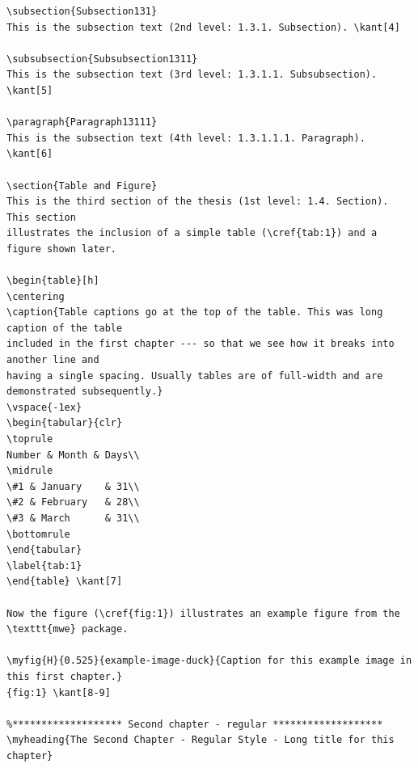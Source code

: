 \documentclass{article}
\begin{document}
\begin{verbatim}
\subsection{Subsection131}
This is the subsection text (2nd level: 1.3.1. Subsection). \kant[4]

\subsubsection{Subsubsection1311}
This is the subsection text (3rd level: 1.3.1.1. Subsubsection). \kant[5]

\paragraph{Paragraph13111}
This is the subsection text (4th level: 1.3.1.1.1. Paragraph). \kant[6]

\section{Table and Figure}
This is the third section of the thesis (1st level: 1.4. Section). This section
illustrates the inclusion of a simple table (\cref{tab:1}) and a figure shown later.

\begin{table}[h]
\centering
\caption{Table captions go at the top of the table. This was long caption of the table
included in the first chapter --- so that we see how it breaks into another line and
having a single spacing. Usually tables are of full-width and are demonstrated subsequently.}
\vspace{-1ex}
\begin{tabular}{clr}
\toprule
Number & Month & Days\\
\midrule
\#1 & January    & 31\\
\#2 & February   & 28\\
\#3 & March      & 31\\
\bottomrule
\end{tabular}
\label{tab:1}
\end{table}	\kant[7]

Now the figure (\cref{fig:1}) illustrates an example figure from the \texttt{mwe} package.

\myfig{H}{0.525}{example-image-duck}{Caption for this example image in this first chapter.}
{fig:1}	\kant[8-9]

%******************* Second chapter - regular *******************
\myheading{The Second Chapter - Regular Style - Long title for this chapter}


\end{verbatim}
\end{document}
